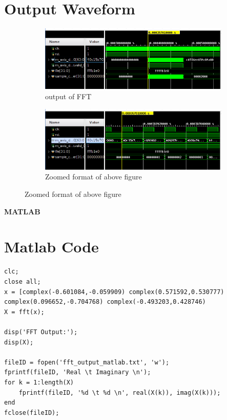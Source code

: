 \documentclass{article}
\begin{document}
\section{Output Waveform}
\vspace{1cm}
\begin{figure}[h]
\centering
\begin{subfigure}[b]{1.2\textwidth}
    \centering
\includegraphics[width=\textwidth]{figs/wav1.png}
    \caption{output of FFT}
    \label{fig:my_label}
\end{subfigure}
\hfill
\begin{subfigure}[b]{1.2\textwidth}
    \centering
\includegraphics[width=\textwidth]{figs/wav2.png}
    \caption{Zoomed format of above figure}
    \label{fig:my_label}
\end{subfigure}
\end{figure}
\vspace{15cm}

\maketitle
\hfill \textbf{MATLAB}
\section{Matlab Code}
\begin{lstlisting}
clc;
close all;
x = [complex(-0.601084,-0.059909) complex(0.571592,0.530777) complex(0.096652,-0.704768) complex(-0.493203,0.428746) 
X = fft(x);

disp('FFT Output:');
disp(X);

fileID = fopen('fft_output_matlab.txt', 'w');
fprintf(fileID, 'Real \t Imaginary \n');
for k = 1:length(X)
    fprintf(fileID, '%d \t %d \n', real(X(k)), imag(X(k)));
end
fclose(fileID);

\end{lstlisting}
\vspace{3cm}
\end{document}

